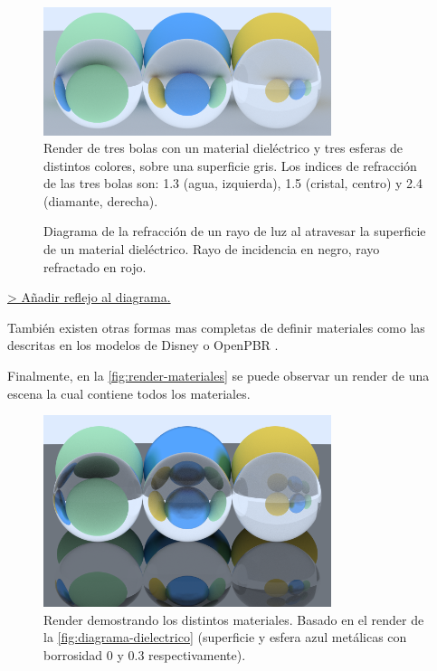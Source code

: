 \documentclass[10pt, a4paper]{article}
\begin{document}
\begin{figure}[H]
    \centering 
    \includegraphics[width=0.75\textwidth]{04_crop}
    \caption{Render de tres bolas con un material dieléctrico y tres esferas de distintos colores, sobre una superficie gris. Los indices de refracción de las tres bolas son: 1.3 (agua, izquierda), 1.5 (cristal, centro) y 2.4 (diamante, derecha).}
    \label{fig:render-dielectrico}
\end{figure}



\begin{figure}[H]
    \centering
    
    \caption{Diagrama de la refracción de un rayo de luz al atravesar la superficie de un material dieléctrico. Rayo de incidencia en negro, rayo refractado en rojo.}
    \label{fig:diagrama-dielectrico}
\end{figure}

    

\underline{> Añadir reflejo al diagrama.}

También existen otras formas mas completas de definir materiales como las descritas en los modelos de Disney \cite{Burley:2012} o OpenPBR \cite{Academy-Software-Foundation:2024}.

Finalmente, en la \autoref{fig:render-materiales} se puede observar un render de una escena la cual contiene todos los materiales.

\begin{figure}[H]
    \centering 
    \includegraphics[width=0.75\textwidth]{01_materials}
    \caption{Render demostrando los distintos materiales. Basado en el render de la \autoref{fig:diagrama-dielectrico} (superficie y esfera azul metálicas con borrosidad 0 y 0.3 respectivamente).}
    \label{fig:render-materiales}
\end{figure}
\end{document}
